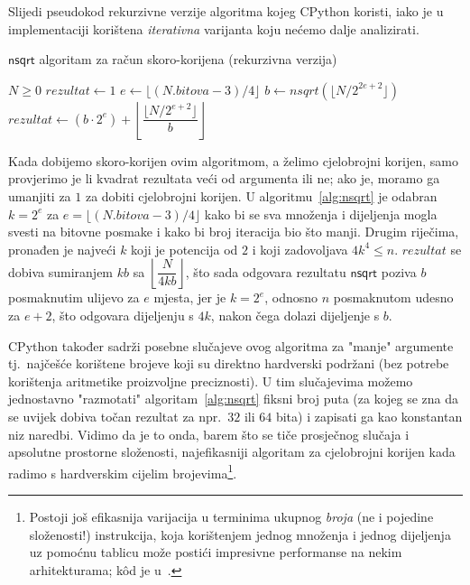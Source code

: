 \documentclass[12pt]{scrartcl}
\begin{document}
Slijedi pseudokod rekurzivne verzije algoritma kojeg CPython koristi, iako je u implementaciji korištena \emph{iterativna} varijanta koju nećemo
dalje analizirati.
\begin{algorithm}
    \caption{$\mathsf{nsqrt}$ algoritam za račun skoro-korijena (rekurzivna verzija)~\cite{mdickpaper}}\label{alg:nsqrt}
    \begin{algorithmic}[1]
    \Require $N \geq 0$
        \State $rezultat \gets 1$
    \Else
        \State $e \gets \lfloor(N.bitova - 3) / 4\rfloor$
        \State $b \gets nsqrt(\lfloor N / 2^{2e+2}\rfloor)$
        \State $rezultat \gets (b \cdot 2^e) + \left\lfloor \dfrac{\lfloor N / 2^{e+2}\rfloor}{b}\right\rfloor$
    \EndIf
    \end{algorithmic}
\end{algorithm}
Kada dobijemo skoro-korijen ovim algoritmom, a želimo cjelobrojni korijen, samo provjerimo je li kvadrat rezultata veći od argumenta ili ne;
ako je, moramo ga umanjiti za $1$ za dobiti cjelobrojni korijen.
U algoritmu~\ref{alg:nsqrt} je odabran $k=2^e$ za $e=\lfloor(N.bitova - 3) / 4\rfloor$ kako bi se sva množenja i dijeljenja mogla svesti
na bitovne posmake i kako bi broj iteracija bio što manji. Drugim riječima, pronađen je najveći $k$ koji je potencija od $2$ i koji
zadovoljava $4k^4 \leq n$. $rezultat$ se dobiva sumiranjem $kb$ sa $\left\lfloor\dfrac{N}{4kb}\right\rfloor$, što sada odgovara rezultatu
$\mathsf{nsqrt}$ poziva $b$ posmaknutim ulijevo za $e$ mjesta, jer je $k=2^e$, odnosno $n$ posmaknutom udesno za $e+2$, što odgovara
dijeljenju s $4k$, nakon čega dolazi dijeljenje s  $b$.

CPython također sadrži posebne slučajeve ovog algoritma za "manje" argumente tj.\ najčešće korištene brojeve koji su direktno hardverski
podržani (bez potrebe korištenja aritmetike proizvoljne preciznosti). U tim slučajevima možemo jednostavno "razmotati" algoritam~\ref{alg:nsqrt} fiksni
broj puta (za kojeg se zna da se uvijek dobiva točan rezultat za npr.\ $32$ ili $64$ bita) i zapisati ga kao konstantan niz naredbi. Vidimo da je to onda,
barem što se tiče prosječnog slučaja i apsolutne prostorne složenosti, najefikasniji algoritam za cjelobrojni korijen kada radimo s hardverskim
cijelim brojevima\footnote{Postoji još efikasnija varijacija u terminima ukupnog \emph{broja} (ne i pojedine složenosti!) instrukcija, koja korištenjem jednog
množenja i jednog
dijeljenja uz pomoćnu tablicu može postići impresivne performanse na nekim arhitekturama; k\^od je u~\cite{mdickpaper}.}.
\end{document}
